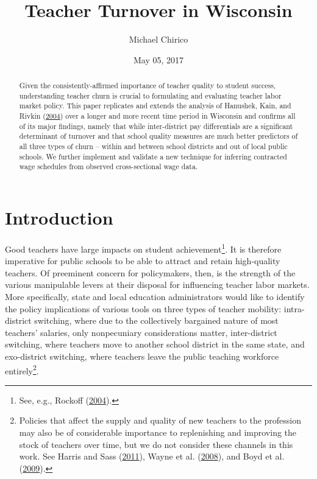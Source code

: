 \documentclass[12pt,]{article}
\title{Teacher Turnover in Wisconsin}
\author{Michael Chirico}
\date{May 05, 2017}
\let\rmarkdownfootnote\footnote%
\def\footnote{\protect\rmarkdownfootnote}
\newcommand{\TAG}[1]{}
\begin{document}
\maketitle
\begin{abstract}
Given the consistently-affirmed importance of teacher quality to student
success, understanding teacher churn is crucial to formulating and
evaluating teacher labor market policy. This paper replicates and
extends the analysis of Hanushek, Kain, and Rivkin
(\protect\hyperlink{ref-hanushek}{2004}) over a longer and more recent
time period in Wisconsin and confirms all of its major findings, namely
that while inter-district pay differentials are a significant
determinant of turnover and that school quality measures are much better
predictors of all three types of churn -- within and between school
districts and out of local public schools. We further implement and
validate a new technique for inferring contracted wage schedules from
observed cross-sectional wage data.
\end{abstract}

\section{Introduction}\label{introduction}

\TAG{BEGIN_INTRO}

Good teachers have large impacts on student achievement\footnote{See,
  e.g., Rockoff (\protect\hyperlink{ref-rockoff}{2004}).}. It is
therefore imperative for public schools to be able to attract and retain
high-quality teachers. Of preeminent concern for policymakers, then, is
the strength of the various manipulable levers at their disposal for
influencing teacher labor markets. More specifically, state and local
education administrators would like to identify the policy implications
of various tools on three types of teacher mobility: intra-district
switching, where due to the collectively bargained nature of most
teachers' salaries, only nonpecuniary considerations matter,
inter-district switching, where teachers move to another school district
in the same state, and exo-district switching, where teachers leave the
public teaching workforce entirely\footnote{Policies that affect the
  supply and quality of new teachers to the profession may also be of
  considerable importance to replenishing and improving the stock of
  teachers over time, but we do not consider these channels in this
  work. See Harris and Sass (\protect\hyperlink{ref-harris}{2011}),
  Wayne et al. (\protect\hyperlink{ref-wayne}{2008}), and Boyd et al.
  (\protect\hyperlink{ref-boyd2009}{2009}).}.
\end{document}
